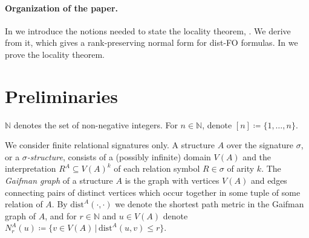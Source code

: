 \documentclass[11pt]{article}
\newcommand{\eqdef}{\coloneqq}
\renewenvironment{leftbar}[1][blue]
{%
\def\FrameCommand
{%
{\hspace{-8pt} \color{#1} \vrule width 3pt}%
\hspace{0pt}%
\fboxsep=\FrameSep\colorbox{#1!5!}%
}%
\MakeFramed{\hsize\hsize\advance\hsize-\width\FrameRestore}%
}
{\endMakeFramed}
\newenvironment{janin}{\begin{leftbar}[blue]{\noindent\bf Jan: }}{\end{leftbar}}
\theoremstyle{remark}
\newcommand{\str}[1]{{{#1}}}
\newcommand{\set}[1]{\{#1\}}
\newcommand{\setof}[2]{\set{#1 \,|\, #2 }}
\def\N{\mathbb N}
\renewcommand{\subset}{\subseteq}
\renewcommand{\le}{\leqslant}
\newcommand{\dist}{\mathrm{dist}}
\newcommand{\distFO}{\textrm{\upshape dist-FO}\xspace}
\begin{document}
\paragraph{Organization of the paper.}
In  we introduce the notions needed to state the locality theorem, .
We derive  from it, which gives a rank-preserving normal form for \distFO formulas. In  we prove the locality theorem.



\section{Preliminaries}\label{sec:preliminaries}
 $\N$ denotes the set of non-negative integers. For $n\in\N$, denote $[n]\eqdef\set{1,\ldots,n}$.

We consider finite relational signatures only.
A structure $A$ over the signature $\sigma$,
 or a \emph{$\sigma$-structure}, consists of a (possibly infinite) domain $V(A)$ and the interpretation
  $R^A\subset V(A)^k$ of each relation symbol $R\in \sigma$ of arity $k$.
The \emph{Gaifman graph} of a structure $A$ is the graph with vertices $V(A)$ and edges connecting pairs of distinct vertices which occur together in some tuple of some relation of $A$. By $\dist^A(\cdot,\cdot)$ we denote the shortest path metric  in the Gaifman graph of $A$, and for $r\in\N$ and $u\in V(A)$ denote $N^A_r(u)\coloneqq\setof{v\in V(A)}{\dist^A(u,v)\le r}$.





\end{document}

